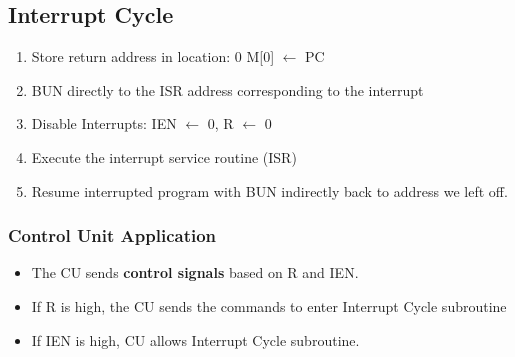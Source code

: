 \documentclass[11pt]{article}
\newenvironment{NumberedList}{%
  \begin{enumerate}[leftmargin=2em, itemsep=0.35em, topsep=0.35em]
}{%
  \end{enumerate}
}
\begin{document}
\subsection{Interrupt Cycle}
\begin{NumberedList}
  \item Store return address in location: 0 M[0] $\leftarrow$ PC
  \item BUN directly to the ISR address corresponding to the interrupt 
  \item Disable Interrupts: IEN $\leftarrow$ 0, R $\leftarrow$ 0
  \item Execute the interrupt service routine (ISR) 
  \item Resume interrupted program with BUN indirectly back to address we left off.  
\end{NumberedList}
\subsubsection{Control Unit Application}
\begin{itemize}
  \item The CU sends \textbf{control signals} based on R and IEN.
  \item If R is high, the CU sends the commands to enter Interrupt Cycle subroutine
  \item If IEN is high, CU allows Interrupt Cycle subroutine.
\end{itemize}
\end{document}
